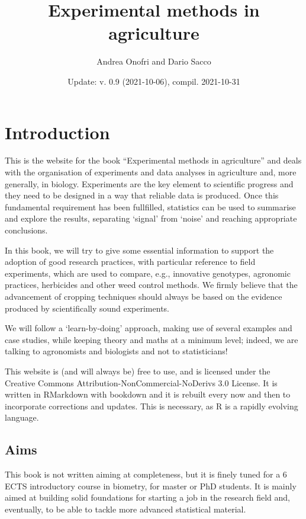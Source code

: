 \documentclass[a4paper,12pt,oneside]{book}
\author{Andrea Onofri and Dario Sacco}
\date{Update: v. 0.9 (2021-10-06), compil. 2021-10-31}
\title{Experimental methods in agriculture}
\subtitle{}
\begin{document}
\maketitle
\tableofcontents

\hypertarget{introduction}{%
\chapter*{Introduction}\label{introduction}}

This is the website for the book ``Experimental methods in agriculture'' and deals with the organisation of experiments and data analyses in agriculture and, more generally, in biology. Experiments are the key element to scientific progress and they need to be designed in a way that reliable data is produced. Once this fundamental requirement has been fullfilled, statistics can be used to summarise and explore the results, separating `signal' from `noise' and reaching appropriate conclusions.

In this book, we will try to give some essential information to support the adoption of good research practices, with particular reference to field experiments, which are used to compare, e.g., innovative genotypes, agronomic practices, herbicides and other weed control methods. We firmly believe that the advancement of cropping techniques should always be based on the evidence produced by scientifically sound experiments.

We will follow a `learn-by-doing' approach, making use of several examples and case studies, while keeping theory and maths at a minimum level; indeed, we are talking to agronomists and biologists and not to statisticians!

This website is (and will always be) free to use, and is licensed under the Creative Commons Attribution-NonCommercial-NoDerivs 3.0 License. It is written in RMarkdown with bookdown and it is rebuilt every now and then to incorporate corrections and updates. This is necessary, as R is a rapidly evolving language.

\hypertarget{aims}{%
\section*{Aims}\label{aims}}

This book is not written aiming at completeness, but it is finely tuned for a 6 ECTS introductory course in biometry, for master or PhD students. It is mainly aimed at building solid foundations for starting a job in the research field and, eventually, to be able to tackle more advanced statistical material.
\end{document}
